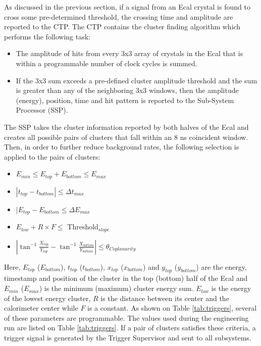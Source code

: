 As discussed in the previous section, if a signal from an Ecal crystal is found
to cross some pre-determined threshold, the crossing time and amplitude are 
reported to the CTP. The CTP contains the cluster finding algorithm
which performs the following task: 
\begin{itemize}
    \item The amplitude of hits from every 3x3 array of crystals in the Ecal that
          is within a programmable number of clock cycles is summed. 
    \item If the 3x3 sum exceeds a pre-defined cluster amplitude threshold and
          the sum is greater than any of the neighboring 3x3 windows, then the 
          amplitude (energy), position, time and hit pattern is reported to the Sub-System
          Processor (SSP).
\end{itemize}

The SSP takes the cluster information reported by both halves of the Ecal and
creates all possible pairs of clusters that fall within an 8 ns coincident
window.  Then, in order to further reduce background rates, the following 
selection is applied to the pairs of clusters: 
\begin{itemize}
    \item $E_{min} \le E_{top} + E_{bottom} \le E_{max}$
    \item $| t_{top} - t_{bottom} | \le \Delta t_{max}$
    \item $|E_{top} - E_{bottom} \le \Delta E_{max}$
    \item $E_{low} + R \times  F \le$ Threshold$_{slope}$
    \item $|\tan^{-1}\frac{X_{top}}{Y_{top}} - \tan^{-1}\frac{X_{bottom}}{Y_{bottom}}| \le \theta_{Coplanarity}$
\end{itemize}
Here, $E_{top}$ ($E_{bottom}$), $t_{top}$ ($t_{bottom}$), $x_{top}$ 
($x_{bottom}$) and $y_{top}$ ($y_{bottom}$) are the energy, timestamp and 
position of the cluster in the top (bottom) half of the Ecal and $E_{min}$ 
($E_{max}$) is the minimum (maximum) cluster energy sum. $E_{low}$ is the 
energy of the lowest energy cluster, $R$ is the distance between its 
center and the calorimeter center while $F$ is a constant. As shown on Table
\ref{tab:triggers}, several of these 
parameters are programmable.  The values used during the engineering run are 
listed on Table \ref{tab:triggers}. If a pair of clusters
satisfies these criteria, a trigger signal is generated by the Trigger Supervisor
and sent to all subsystems. 

